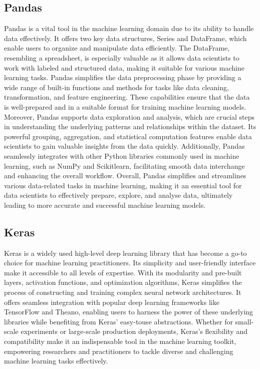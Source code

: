 \subsection{Pandas}
Pandas is a vital tool in the machine learning domain due to its ability to handle data 
effectively. It offers two key data structures, Series and DataFrame, which enable users 
to organize and manipulate data efficiently. The DataFrame, resembling a spreadsheet, 
is especially valuable as it allows data scientists to work with labeled and structured 
data, making it suitable for various machine learning tasks. Pandas simplifies the data 
preprocessing phase by providing a wide range of built-in functions and methods for 
tasks like data cleaning, transformation, and feature engineering. These capabilities 
ensure that the data is well-prepared and in a suitable format for training machine 
learning models.
Moreover, Pandas supports data exploration and analysis, which are crucial steps in 
understanding the underlying patterns and relationships within the dataset. Its powerful 
grouping, aggregation, and statistical computation features enable data scientists to gain 
valuable insights from the data quickly. Additionally, Pandas seamlessly integrates with 
other Python libraries commonly used in machine learning, such as NumPy and 
Scikitlearn, facilitating smooth data interchange and enhancing the overall workflow. 
Overall, Pandas simplifies and streamlines various data-related tasks in machine 
learning, making it an essential tool for data scientists to effectively prepare, explore, 
and analyse data, ultimately leading to more accurate and successful machine learning 
models.
\subsection{Keras}
Keras is a widely used high-level deep learning library that has become a go-to choice 
for machine learning practitioners. Its simplicity and user-friendly interface make it 
accessible to all levels of expertise. With its modularity and pre-built layers, activation 
functions, and optimization algorithms, Keras simplifies the process of constructing 
and training complex neural network architectures. It offers seamless integration with 
popular deep learning frameworks like TensorFlow and Theano, enabling users to 
harness the power of these underlying libraries while benefiting from Keras' easy-touse 
abstractions. Whether for small-scale experiments or large-scale production 
deployments, Keras's flexibility and compatibility make it an indispensable tool in the 
machine learning toolkit, empowering researchers and practitioners to tackle diverse 
and challenging machine learning tasks effectively.
